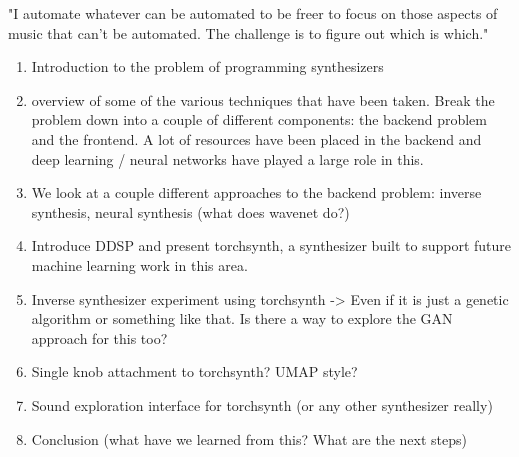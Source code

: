 
"I automate whatever can be automated to be freer to focus on those aspects of music that can't be automated. The challenge is to figure out which is which." \cite{hinkle2006women}

\begin{enumerate}
    \item Introduction to the problem of programming synthesizers
    \item overview of some of the various techniques that have been taken. Break the problem down into a couple of different components: the backend problem and the frontend. A lot of resources have been placed in the backend and deep learning / neural networks have played a large role in this.
    \item We look at a couple different approaches to the backend problem: inverse synthesis, neural synthesis (what does wavenet do?)
    \item Introduce DDSP and present torchsynth, a synthesizer built to support future machine learning work in this area.
    \item Inverse synthesizer experiment using torchsynth -> Even if it is just a genetic algorithm or something like that. Is there a way to explore the GAN approach for this too?
    \item Single knob attachment to torchsynth? UMAP style?
    \item Sound exploration interface for torchsynth (or any other synthesizer really)
    \item Conclusion (what have we learned from this? What are the next steps)
    
\end{enumerate}

\label{chapter:introduction}

